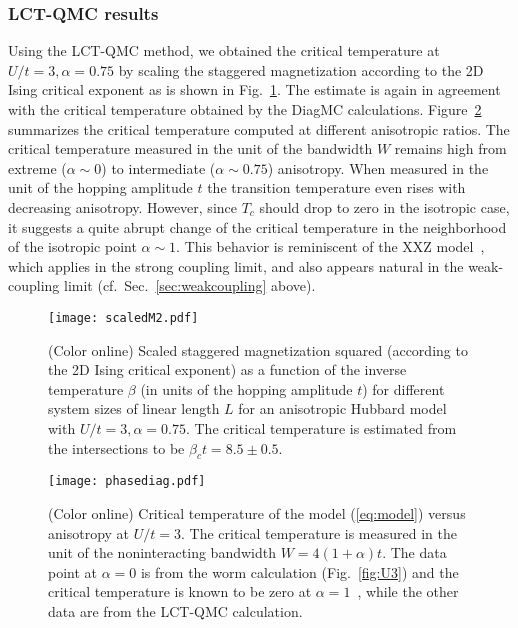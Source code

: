 \documentclass[twocolumn,superscriptaddress,pra,showpacs,longbibliography]{revtex4-1}
\newcommand{\<}{\langle}
\renewcommand{\>}{\rangle}
\begin{document}
\subsubsection{LCT-QMC results}

Using the LCT-QMC method, we obtained the critical temperature at $U/t=3,\alpha=0.75$ by scaling the staggered magnetization according to the 2D Ising critical exponent as is shown in Fig.~\ref{fig:LCT-QMC}. The estimate is again in agreement with the critical temperature obtained by the DiagMC calculations. 
Figure~\ref{fig:phasediag} summarizes the critical temperature computed at different anisotropic ratios. The critical temperature measured in the unit of the bandwidth $W$ remains high from extreme ($\alpha\sim0$) to intermediate ($\alpha\sim0.75$) anisotropy. When measured in the unit of the hopping amplitude $t$ the transition temperature even rises with decreasing anisotropy. However, since $T_c$ should drop to zero in the isotropic case, it suggests a quite abrupt change of the critical temperature in the neighborhood of the isotropic point $\alpha\sim1$. This behavior is reminiscent of the XXZ model~\cite{1402-4896-32-4-016}, which applies in the strong coupling limit, and also appears natural in the weak-coupling limit (cf.\ Sec.~\ref{sec:weakcoupling} above). 

\begin{figure}[!b]
\texttt{[image: scaledM2.pdf]}
\caption{(Color online)  Scaled staggered magnetization squared (according to the 2D Ising critical exponent) as a function of the inverse temperature $\beta$ (in units of the hopping amplitude $t$) for different system sizes of linear length $L$ for an anisotropic Hubbard model with $U/t=3,\alpha=0.75$. The critical temperature is estimated from the intersections to be $\beta_c t =8.5\pm0.5$.} 
\label{fig:LCT-QMC}
\end{figure}

\begin{figure}[!b]
\texttt{[image: phasediag.pdf]}
\caption{(Color online) Critical temperature of the model (\ref{eq:model}) versus anisotropy at $U/t=3$. The critical temperature is measured in the unit of the noninteracting bandwidth $W=4(1+\alpha)t$. The data point at $\alpha=0$ is from the worm calculation (Fig.~\ref{fig:U3}) and the  critical temperature is known to be zero at $\alpha=1$~\cite{MerminWagnerTheorem1966}, while the other data are from the LCT-QMC calculation.} 
\label{fig:phasediag}
\end{figure}
\end{document}

